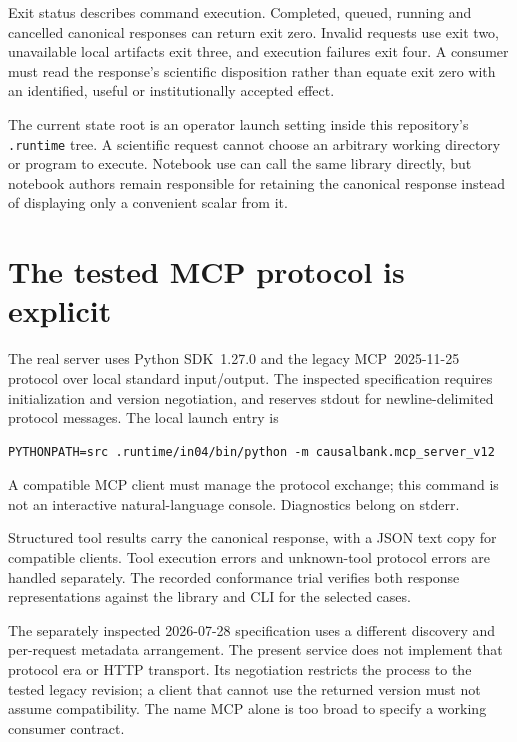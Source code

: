 Exit status describes command execution. Completed, queued, running and
cancelled canonical responses can return exit zero. Invalid requests use exit
two, unavailable local artifacts exit three, and execution failures exit four.
A consumer must read the response's scientific disposition rather than equate
exit zero with an identified, useful or institutionally accepted effect.

The current state root is an operator launch setting inside this repository's
\texttt{.runtime} tree. A scientific request cannot choose an arbitrary working
directory or program to execute. Notebook use can call the same library
directly, but notebook authors remain responsible for retaining the canonical
response instead of displaying only a convenient scalar from it.

\section{The tested MCP protocol is explicit}

The real server uses Python SDK~1.27.0 and the legacy MCP~2025-11-25 protocol
over local standard input/output. The inspected specification requires
initialization and version negotiation, and reserves stdout for newline-delimited
protocol messages.\cite{v12_mcp_legacy_lifecycle,v12_mcp_legacy_stdio}
The local launch entry is
\begin{lstlisting}
PYTHONPATH=src .runtime/in04/bin/python -m causalbank.mcp_server_v12
\end{lstlisting}
A compatible MCP client must manage the protocol exchange; this command is not
an interactive natural-language console. Diagnostics belong on stderr.

Structured tool results carry the canonical response, with a JSON text copy for
compatible clients. Tool execution errors and unknown-tool protocol errors are
handled separately.\cite{v12_mcp_legacy_tools,v12_in_runtime} The recorded
conformance trial verifies both response representations against the library
and CLI for the selected cases.

The separately inspected 2026-07-28 specification uses a different discovery
and per-request metadata arrangement.\cite{v12_mcp_versioning,v12_mcp_basic}
The present service does not implement that protocol era or HTTP transport.
Its negotiation restricts the process to the tested legacy revision; a client
that cannot use the returned version must not assume compatibility. The name
MCP alone is too broad to specify a working consumer contract.

